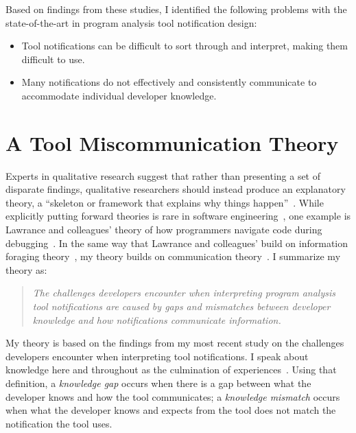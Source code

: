 \documentclass{llncs}
\begin{document}
Based on findings from these studies, I identified the following problems with the state-of-the-art in program analysis tool notification design:

\begin{itemize}
	\item Tool notifications can be difficult to sort through and interpret, making them difficult to use.
	\item Many notifications do not effectively and consistently communicate to accommodate individual developer knowledge.
\end{itemize}

\section{A Tool Miscommunication Theory}\label{sec:theory}

Experts in qualitative research suggest that rather than presenting a set of disparate findings, qualitative researchers should instead produce an explanatory theory, a ``skeleton or framework that explains why things happen''~\cite{corbin2014basics}. While explicitly putting forward theories is rare in software engineering~\cite{hannay2007systematic}, one example is Lawrance and colleagues' theory of how programmers navigate code during debugging~\cite{lawrance2013programmers}. In the same way that Lawrance and colleagues' build on 
information foraging theory~\cite{pirolli1999information}, my theory builds on communication theory~\cite{bowman1987modeling}.
I summarize my theory as:

\begin{quotation}
	\noindent
	\emph{The challenges developers encounter when interpreting program analysis tool notifications are caused by gaps and mismatches between developer knowledge and how notifications communicate information.}
\end{quotation}

My theory is based on the findings from my most recent study on the challenges developers encounter when interpreting tool notifications. 
I speak about knowledge here and throughout as the culmination of experiences~\cite{johnson1989mental,argote2011organizational}.
Using that definition, a \emph{knowledge gap} occurs when there is a gap between what the developer knows and how the tool communicates; a \emph{knowledge mismatch} occurs when what the developer knows and expects from the tool does not match the notification the tool uses.
\end{document}
